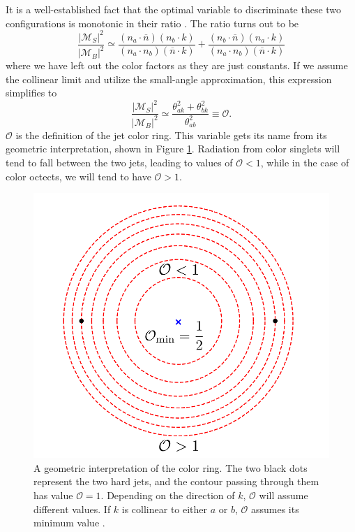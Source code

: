 \documentclass[10pt,a4paper]{book}
\begin{document}
It is a well-established fact that the optimal variable to discriminate these two configurations is monotonic in their ratio \cite{Neyman1992}. The ratio turns out to be
\begin{equation}
\frac{\vert \mathcal{M}_S \vert^2}{\vert \mathcal{M}_B \vert^2} \simeq \frac{(n_a \cdot \overline{n})(n_b \cdot k)}{(n_a \cdot n_b)(\overline{n} \cdot k)} + \frac{(n_b \cdot \overline{n})(n_a \cdot k)}{(n_a \cdot n_b)(\overline{n} \cdot k)}
\end{equation}
where we have left out the color factors as they are just constants. If we assume the collinear limit and utilize the small-angle approximation, this expression simplifies to 
\begin{equation}
\frac{\vert \mathcal{M}_S \vert^2}{\vert \mathcal{M}_B \vert^2} \simeq \frac{\theta_{ak}^2 + \theta_{bk}^2}{\theta_{ab}^2} \equiv \mathcal{O}.
\label{color ring}
\end{equation}
$\mathcal{O}$ is the definition of the jet color ring. This variable gets its name from its geometric interpretation, shown in Figure \ref{color ring geometry}. Radiation from color singlets will tend to fall between the two jets, leading to values of $\mathcal{O} < 1$, while in the case of color octects, we will tend to have $\mathcal{O} > 1$. 
\begin{figure}
\centering
\includegraphics[scale=0.3]{ch4_images/cr}
\caption{A geometric interpretation of the color ring. The two black dots represent the two hard jets, and the contour passing through them has value $\mathcal{O} = 1$. Depending on the direction of $k$, $\mathcal{O}$ will assume different values. If $k$ is collinear to either $a$ or $b$, $\mathcal{O}$ assumes its minimum value \cite{Buckley:2020kdp}.}
\label{color ring geometry}
\end{figure}
\end{document}
